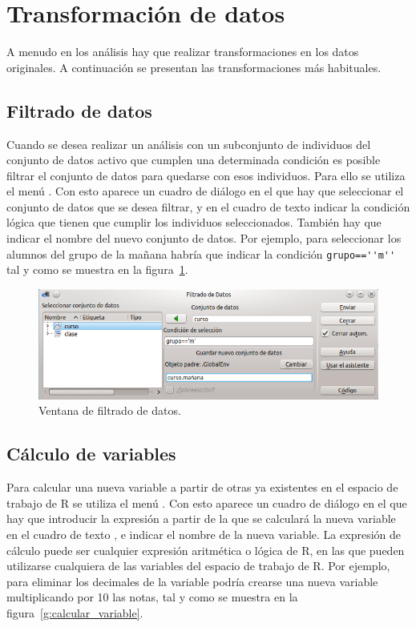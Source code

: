 \section{Transformación de datos}
A menudo en los análisis hay que realizar transformaciones en los datos originales.
A continuación se presentan las transformaciones más habituales.


\subsection{Filtrado de datos}
Cuando se desea realizar un análisis con un subconjunto de individuos del conjunto de datos activo que cumplen una
determinada condición es posible filtrar el conjunto de datos para quedarse con esos individuos.
Para ello se utiliza el menú .
Con esto aparece un cuadro de diálogo en el que hay que seleccionar el conjunto de datos que se desea filtrar, y en el
cuadro de texto  indicar la condición lógica que tienen que cumplir los individuos
seleccionados.
También hay que indicar el nombre del nuevo conjunto de datos.
Por ejemplo, para seleccionar los alumnos del grupo de la mañana habría que indicar la condición
\lstinline{grupo==''m''} tal y como se muestra en la figura~\ref{g:filtrar_datos}.

\begin{figure}[htp]
\begin{center}
  \includegraphics[scale=0.6]{introduccion_r/img/filtrar}
  \caption{Ventana de filtrado de datos.}
  \label{g:filtrar_datos}
\end{center}
\end{figure}


\subsection{Cálculo de variables}
Para calcular una nueva variable a partir de otras ya existentes en el espacio de trabajo de R se utiliza el menú
.
Con esto aparece un cuadro de diálogo en el que hay que introducir la expresión a partir de la que se calculará la nueva
variable en el cuadro de texto , e indicar el nombre de la nueva variable.
La expresión de cálculo puede ser cualquier expresión aritmética o lógica de R, en las que pueden utilizarse cualquiera
de las variables del espacio de trabajo de R. Por ejemplo, para eliminar los decimales de la variable 
podría crearse una nueva variable  multiplicando por 10 las notas, tal y como se muestra en la
figura~\ref{g:calcular_variable}.

